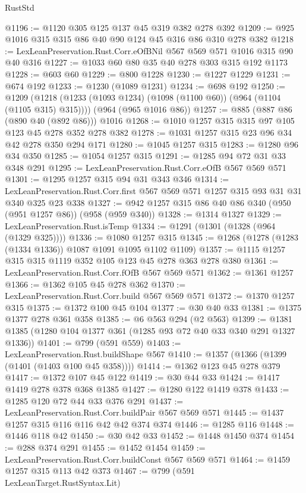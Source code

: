 \begin{lexlean}{RustStd}
\begin{coremodule}
{\begin{coremodule}
{{{{{{{{{@1196 := @1120 @305 @125 @137 @45 @319 @382 @278 @392
@1209 := @925 @1016 @315 @315 @86 @40 @90 @124 @45 @316 @86 @310 @278 @382
@1218 := LexLeanPreservation.Rust.Corr.eOfBNil @567 @569 @571 @1016 @315 @90 @40 @316
@1227 := @1033 @60 @80 @35 @40 @278 @303 @315 @192 @1173
@1228 := @603 @60
@1229 := @800 @1228
@1230 := @1227 @1229
@1231 := @674 @192
@1233 := @1230 (@1089 @1231)
@1234 := @698 @192
@1250 := @1209
    (@1218 (@1233 (@1093 @1234) (@1098 (@1100 @60)) (@964 (@1104 (@1105 @315) @315))))
    (@964 (@965 @1016 @86))
@1257 := @885 (@887 @86 (@890 @40 (@892 @86))) @1016
@1268 := @1010 @1257 @315 @315 @97 @105 @123 @45 @278 @352 @278 @382
@1278 := @1031 @1257 @315 @23 @96 @34 @42 @278 @350 @294 @171
@1280 := @1045 @1257 @315
@1283 := @1280 @96 @34 @350
@1285 := @1054 @1257 @315
@1291 := @1285 @94 @72 @31 @33 @348 @291
@1295 := LexLeanPreservation.Rust.Corr.eOfB @567 @569 @571
@1301 := @1295 @1257 @315 @94 @31 @343 @346
@1314 := LexLeanPreservation.Rust.Corr.first
    @567
    @569
    @571
    @1257
    @315
    @93
    @31
    @31
    @340
    @325
    @23
    @338
@1327 := @942 @1257 @315 @86 @40 @86 @340 (@950 (@951 @1257 @86)) (@958 (@959 @340))
@1328 := @1314 @1327
@1329 := LexLeanPreservation.Rust.isTemp
@1334 := @1291 (@1301 (@1328 (@964 (@1329 @325))))
@1336 := @1080 @1257 @315
@1345 := @1268 (@1278 (@1283 (@1334 @1336)) @1087 @1091 @1095 @1102 @1109)
@1357 := @1115 @1257 @315 @315 @1119 @352 @105 @123 @45 @278 @363 @278 @380
@1361 := LexLeanPreservation.Rust.Corr.fOfB @567 @569 @571
@1362 := @1361 @1257
@1366 := @1362 @105 @45 @278 @362
@1370 := LexLeanPreservation.Rust.Corr.build @567 @569 @571
@1372 := @1370 @1257 @315
@1375 := @1372 @100 @45 @104
@1377 := @30 @40 @33
@1381 := @1375 @1377 @278 @361 @358
@1385 := @6 @563 @294 (@2 @563)
@1399 := @1381 @1385 (@1280 @104 @1377 @361 (@1285 @93 @72 @40 @33 @340 @291 @1327 @1336))
@1401 := @799 (@591 @559)
@1403 := LexLeanPreservation.Rust.buildShape @567
@1410 := @1357 (@1366 (@1399 (@1401 (@1403 @100 @45 @358))))
@1414 := @1362 @123 @45 @278 @379
@1417 := @1372 @107 @45 @122
@1419 := @30 @44 @33
@1424 := @1417 @1419 @278 @378 @368 @1385
@1427 := @1280 @122 @1419 @378
@1433 := @1285 @120 @72 @44 @33 @376 @291
@1437 := LexLeanPreservation.Rust.Corr.buildPair @567 @569 @571
@1445 := @1437 @1257 @315 @116 @116 @42 @42 @374 @374
@1446 := @1285 @116
@1448 := @1446 @118 @42
@1450 := @30 @42 @33
@1452 := @1448 @1450 @374
@1454 := @288 @374 @291
@1455 := @1452 @1454
@1459 := LexLeanPreservation.Rust.Corr.buildConst @567 @569 @571
@1464 := @1459 @1257 @315 @113 @42 @373
@1467 := @799 (@591 LexLeanTarget.RustSyntax.Lit)
}}}}}}}}}
\end{coremodule}}
\end{coremodule}
\end{lexlean}
